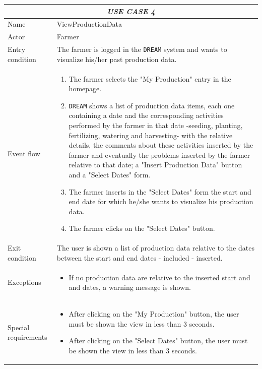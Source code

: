 \documentclass{article}
\begin{document}
\centering
\begin{longtable}{|p{3.5cm}|m{8cm}|}
 \hline
 \multicolumn{2}{|c|}{\cellcolor{white}\emph{USE CASE 4}} \\
 \endfirsthead
 \endhead
 \endfoot
 \endlastfoot
 \hline
 Name & ViewProductionData\\
 \hline
 Actor & Farmer\\
 \hline
 Entry condition & The farmer is logged in the \verb|DREAM| system and wants to visualize his/her past production data.\\
 \hline
 Event flow & \begin{enumerate}
    \item The farmer selects the "My Production" entry in the homepage.
    \item \verb|DREAM| shows a list of production data items, each one containing a date and the corresponding activities performed by the farmer in that date -seeding, planting, fertilizing, watering and harvesting- with the relative details, the comments about these activities inserted by the farmer and eventually the problems inserted by the farmer relative to that date; a "Insert Production Data" button and a "Select Dates" form.
    \item The farmer inserts in the "Select Dates" form the start and end date for which he/she wants to visualize his production data.
    \item The farmer clicks on the "Select Dates" button.
 \end{enumerate}\\
 \hline
 Exit condition & The user is shown a list of production data relative to the dates between the start and end dates - included - inserted.\\
 \hline
 Exceptions & \begin{itemize}
     \item If no production data are relative to the inserted start and and dates, a warning message is shown.
 \end{itemize}\\
 \hline
 Special requirements & \begin{itemize}
     \item After clicking on the "My Production" button, the user must be shown the view in less than 3 seconds.
     \item After clicking on the "Select Dates" button, the user must be shown the view in less than 3 seconds.
 \end{itemize}\\
 \hline
\end{longtable}
\end{document}
